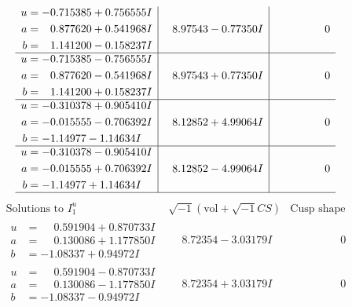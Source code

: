 \documentclass[1p]{elsarticle_modified}
\theoremstyle{definition}
\newcommand{\I}{\sqrt{-1}}
\begin{document}
$$\begin{array}{c|c|c}
\begin{aligned}
u &= -0.715385 + 0.756555 I \\
a &= \phantom{-}0.877620 + 0.541968 I \\
b &= \phantom{-}1.141200 - 0.158237 I\end{aligned}
 & \phantom{-}8.97543 - 0.77350 I & \phantom{-0.000000 } 0 \\ \hline\begin{aligned}
u &= -0.715385 - 0.756555 I \\
a &= \phantom{-}0.877620 - 0.541968 I \\
b &= \phantom{-}1.141200 + 0.158237 I\end{aligned}
 & \phantom{-}8.97543 + 0.77350 I & \phantom{-0.000000 } 0 \\ \hline\begin{aligned}
u &= -0.310378 + 0.905410 I \\
a &= -0.015555 - 0.706392 I \\
b &= -1.14977 - 1.14634 I\end{aligned}
 & \phantom{-}8.12852 + 4.99064 I & \phantom{-0.000000 } 0 \\ \hline\begin{aligned}
u &= -0.310378 - 0.905410 I \\
a &= -0.015555 + 0.706392 I \\
b &= -1.14977 + 1.14634 I\end{aligned}
 & \phantom{-}8.12852 - 4.99064 I & \phantom{-0.000000 } 0\\
 \hline 
 \end{array}$$\newpage$$\begin{array}{c|c|c}  
\text{Solutions to }I^u_{1}& \I (\text{vol} + \sqrt{-1}CS) & \text{Cusp shape}\\
 \hline 
\begin{aligned}
u &= \phantom{-}0.591904 + 0.870733 I \\
a &= \phantom{-}0.130086 + 1.177850 I \\
b &= -1.08337 + 0.94972 I\end{aligned}
 & \phantom{-}8.72354 - 3.03179 I & \phantom{-0.000000 } 0 \\ \hline\begin{aligned}
u &= \phantom{-}0.591904 - 0.870733 I \\
a &= \phantom{-}0.130086 - 1.177850 I \\
b &= -1.08337 - 0.94972 I\end{aligned}
 & \phantom{-}8.72354 + 3.03179 I & \phantom{-0.000000 } 0 \\ \hline\begin{aligned}

\end{aligned}
\end{array}$$
\end{document}
